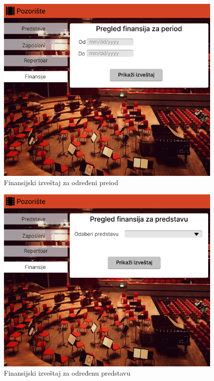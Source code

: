 \documentclass[a4paper]{article}
\begin{document}
\begin{figure}[H]
  \begin{center}
    \includegraphics[width=130mm]{../images/supervizor_finansije_izvestaj.png}
  \end{center}
  \caption{Finansijski izveštaj za određeni preiod}
  \label{supervizor_finansije_izvestaj}
\end{figure}\begin{figure}[H]

  \begin{center}
    \includegraphics[width=130mm]{../images/supervizor_finansije4.png}
  \end{center}
  \caption{Finansijski izveštaj za određenu predstavu}
  \label{supervizor_finansije4}
\end{figure}
\end{document}
